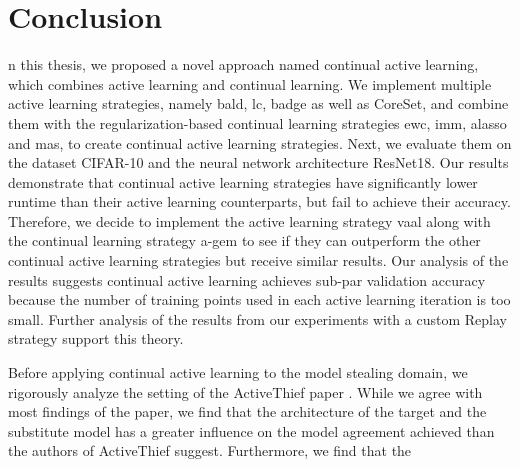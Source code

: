 
\chapter{Conclusion}
\label{ch:Conclusion}
n this thesis, we proposed a novel approach named continual active learning, which combines active learning and continual learning. 
We implement multiple active learning strategies, namely \gls{bald}, \gls{lc}, \gls{badge} as well as CoreSet, and combine them with
the regularization-based continual learning strategies \gls{ewc}, \gls{imm}, \gls{alasso} and \gls{mas}, to create continual active
learning strategies. Next, we evaluate them on the dataset CIFAR-10 and the neural network architecture ResNet18. Our results demonstrate
that continual active learning strategies have significantly lower runtime than their active learning counterparts, but fail to achieve
their accuracy. Therefore, we decide to implement the active learning strategy \gls{vaal} along with the continual learning strategy \gls{a-gem}
to see if they can outperform the other continual active learning strategies but receive similar results. Our analysis of the results
suggests continual active learning achieves sub-par validation accuracy because the number of training points used in each active
learning iteration is too small. Further analysis of the results from our experiments with a custom Replay strategy support this theory. \par
Before applying continual active learning to the model stealing domain, we rigorously analyze the setting of the ActiveThief paper
\cite{pal2020activethief}. While we agree with most findings of the paper, we find that the architecture of the target and the substitute
model has a greater influence on the model agreement achieved than the authors of ActiveThief suggest. Furthermore, we find that the
